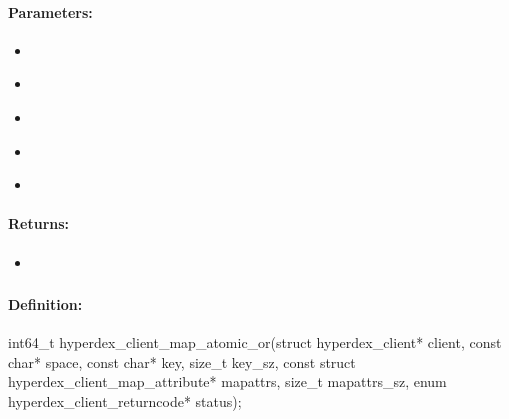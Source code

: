 \paragraph{Parameters:}
\begin{itemize}[noitemsep]
\item {}\\

\item {}\\

\item {}\\

\item {}\\

\item {}\\

\end{itemize}

\paragraph{Returns:}
\begin{itemize}[noitemsep]
\item {}\\

\end{itemize}

\pagebreak
\subsubsection{}
\label{api:c:map_atomic_or}


\paragraph{Definition:}
\begin{ccode}
int64_t hyperdex_client_map_atomic_or(struct hyperdex_client* client,
        const char* space,
        const char* key, size_t key_sz,
        const struct hyperdex_client_map_attribute* mapattrs, size_t mapattrs_sz,
        enum hyperdex_client_returncode* status);
\end{ccode}

